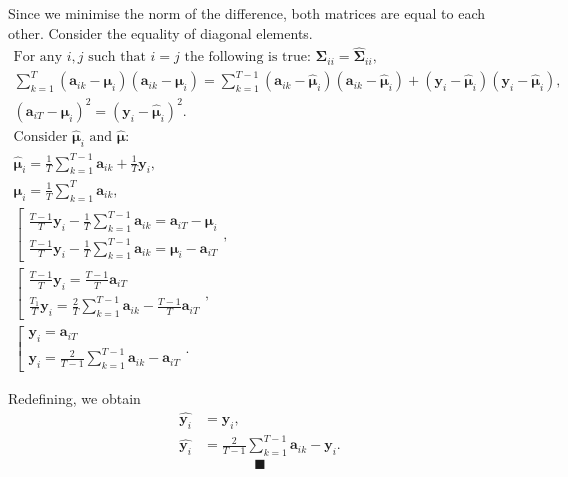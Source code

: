 \documentclass{article}
\begin{document}
Since we minimise the norm of the difference, both matrices are equal to each other. Consider the equality of diagonal elements.
\begin{gather*}
	\text{For any } i, j \text{ such that } i = j \text{ the following is true: } \mathbf{\Sigma}_{ii} = \hat{\mathbf{\Sigma}}_{ii},\\
	\sum_{k=1}^{T}(\mathbf{a}_{ik} - \boldsymbol{\mu}_i)(\mathbf{a}_{ik}-\boldsymbol{\mu}_i) = \sum_{k=1}^{T-1}(\mathbf{a}_{ik} - \hat{\boldsymbol{\mu}}_i)(\mathbf{a}_{ik}-\hat{\boldsymbol{\mu}}_i) + (\mathbf{y}_i - \hat{\boldsymbol{\mu}}_i)(\mathbf{y}_i - \hat{\boldsymbol{\mu}}_i),\\
	(\mathbf{a}_{iT}-\boldsymbol{\mu}_i)^2 = (\mathbf{y}_i-\hat{\boldsymbol{\mu}}_i)^2.\\
	\text{Consider } \hat{\boldsymbol{\mu}}_i \text{ and } \hat{\boldsymbol{\mu}}:\\
	\hat{\boldsymbol{\mu}}_i = \frac{1}{T}\sum_{k=1}^{T-1}\mathbf{a}_{ik} + \frac{1}{T}\mathbf{y}_i,\\
	\boldsymbol{\mu}_i = \frac{1}{T}\sum_{k=1}^{T}\mathbf{a}_{ik},\\
	\left[
	\begin{array}{ll}
		\frac{T-1}{T}\mathbf{y}_i-\frac{1}{T}\sum_{k=1}^{T-1}\mathbf{a}_{ik}=\mathbf{a}_{iT}-\boldsymbol{\mu}_i
		\\[1ex]
		\frac{T-1}{T}\mathbf{y}_i-\frac{1}{T}\sum_{k=1}^{T-1}\mathbf{a}_{ik}=\boldsymbol{\mu}_i-\mathbf{a}_{iT}
	\end{array},
	\right .\\[1ex]
	\left[
	\begin{array}{ll}
		\frac{T-1}{T}\mathbf{y}_i = \frac{T-1}{T}\mathbf{a}_{iT}
		\\[1ex]
		\frac{T_1}{T}\mathbf{y}_i = \frac{2}{T} \sum_{k=1}^{T-1} \mathbf{a}_{ik} - \frac{T-1}{T}\mathbf{a}_{iT}
	\end{array},
	\right .\\[1ex]
	\left[
	\begin{array}{ll}
		\mathbf{y}_i = \mathbf{a}_{iT}
		\\[1ex]
		\mathbf{y}_i = \frac{2}{T-1} \sum_{k=1}^{T-1} \mathbf{a}_{ik} - \mathbf{a}_{iT}
	\end{array}.
	\right .
\end{gather*}

Redefining, we obtain
\begin{align*}
	\hat{\mathbf{y}_i} &= \mathbf{y}_i,\\
	\hat{\mathbf{y}_i} &= \frac{2}{T-1} \sum_{k=1}^{T-1} \mathbf{a}_{ik} - \mathbf{y}_i.
\end{align*}
$$ \blacksquare $$
\end{document}
